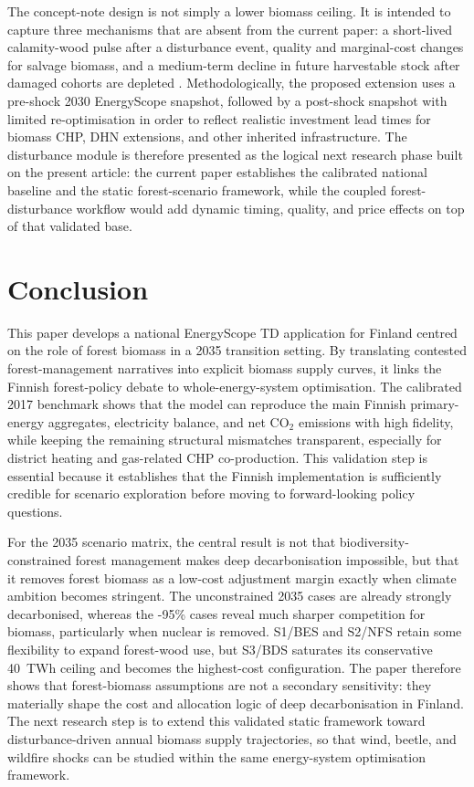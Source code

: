\documentclass{article}
\begin{document}
The concept-note design is not simply a lower biomass ceiling. It is intended to capture three mechanisms that are absent from the current paper: a short-lived calamity-wood pulse after a disturbance event, quality and marginal-cost changes for salvage biomass, and a medium-term decline in future harvestable stock after damaged cohorts are depleted \citep{tothImpactsCalamityLogging2020,reckaRoleBiomassDecarbonisation2023}. Methodologically, the proposed extension uses a pre-shock 2030 EnergyScope snapshot, followed by a post-shock snapshot with limited re-optimisation in order to reflect realistic investment lead times for biomass CHP, DHN extensions, and other inherited infrastructure. The disturbance module is therefore presented as the logical next research phase built on the present article: the current paper establishes the calibrated national baseline and the static forest-scenario framework, while the coupled forest-disturbance workflow would add dynamic timing, quality, and price effects on top of that validated base.


\section{Conclusion}
\label{sec:conclusion}

This paper develops a national EnergyScope TD application for Finland centred on the role of forest biomass in a 2035 transition setting. By translating contested forest-management narratives into explicit biomass supply curves, it links the Finnish forest-policy debate to whole-energy-system optimisation. The calibrated 2017 benchmark shows that the model can reproduce the main Finnish primary-energy aggregates, electricity balance, and net CO$_2$ emissions with high fidelity, while keeping the remaining structural mismatches transparent, especially for district heating and gas-related CHP co-production. This validation step is essential because it establishes that the Finnish implementation is sufficiently credible for scenario exploration before moving to forward-looking policy questions.

For the 2035 scenario matrix, the central result is not that biodiversity-constrained forest management makes deep decarbonisation impossible, but that it removes forest biomass as a low-cost adjustment margin exactly when climate ambition becomes stringent. The unconstrained 2035 cases are already strongly decarbonised, whereas the -95\% cases reveal much sharper competition for biomass, particularly when nuclear is removed. S1/BES and S2/NFS retain some flexibility to expand forest-wood use, but S3/BDS saturates its conservative 40~TWh ceiling and becomes the highest-cost configuration. The paper therefore shows that forest-biomass assumptions are not a secondary sensitivity: they materially shape the cost and allocation logic of deep decarbonisation in Finland. The next research step is to extend this validated static framework toward disturbance-driven annual biomass supply trajectories, so that wind, beetle, and wildfire shocks can be studied within the same energy-system optimisation framework.







\end{document}
